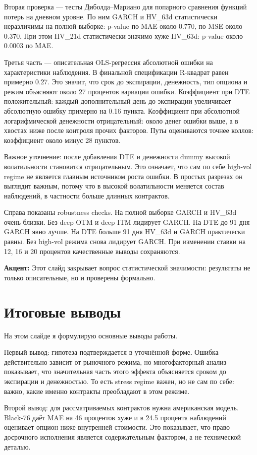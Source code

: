 \documentclass[11pt,a4paper]{article}
\newcommand{\slidetitle}[1]{\section{#1}}
\newcommand{\note}[1]{%
  \vspace{0.15em}
  \noindent\colorbox{softblue}{%
    \parbox{\dimexpr\linewidth-2\fboxsep\relax}{\textbf{Акцент:} #1}%
  }\vspace{0.25em}
}
\begin{document}
Вторая проверка --- тесты Диболда--Мариано для попарного сравнения функций потерь на дневном уровне. По ним GARCH и HV\_63d статистически неразличимы на полной выборке: p-value по MAE около 0.770, по MSE около 0.370. При этом HV\_21d статистически значимо хуже HV\_63d: p-value около 0.0003 по MAE.

Третья часть --- описательная OLS-регрессия абсолютной ошибки на характеристики наблюдения. В финальной спецификации R-квадрат равен примерно 0.27. Это значит, что срок до экспирации, денежность, тип опциона и режим объясняют около 27 процентов вариации ошибки. Коэффициент при DTE положительный: каждый дополнительный день до экспирации увеличивает абсолютную ошибку примерно на 0.16 пункта. Коэффициент при абсолютной логарифмической денежности отрицательный: около денег ошибки выше, а в хвостах ниже после контроля прочих факторов. Путы оцениваются точнее коллов: коэффициент около минус 28 пунктов.

Важное уточнение: после добавления DTE и денежности dummy высокой волатильности становится отрицательным. Это означает, что сам по себе high-vol regime не является главным источником роста ошибки. В простых разрезах он выглядит важным, потому что в высокой волатильности меняется состав наблюдений, в частности больше длинных контрактов.

Справа показаны robustness checks. На полной выборке GARCH и HV\_63d очень близки. Без deep OTM и deep ITM лидирует GARCH. На DTE до 91 дня GARCH явно лучше. На DTE больше 91 дня HV\_63d и GARCH практически равны. Без high-vol режима снова лидирует GARCH. При изменении ставки на 12, 16 и 20 процентов качественные выводы сохраняются.

\note{Этот слайд закрывает вопрос статистической значимости: результаты не только описательные, но и проверены формально.}

\slidetitle{Итоговые выводы}

На этом слайде я формулирую основные выводы работы.

Первый вывод: гипотеза подтверждается в уточнённой форме. Ошибка действительно зависит от рыночного режима, но многофакторный анализ показывает, что значительная часть этого эффекта объясняется сроком до экспирации и денежностью. То есть stress regime важен, но не сам по себе: важно, какие именно контракты преобладают в этом режиме.

Второй вывод: для рассматриваемых контрактов нужна американская модель. Black-76 даёт MAE на 46 процентов хуже и в 24.5 процента наблюдений оценивает опцион ниже внутренней стоимости. Это показывает, что право досрочного исполнения является содержательным фактором, а не технической деталью.
\end{document}
